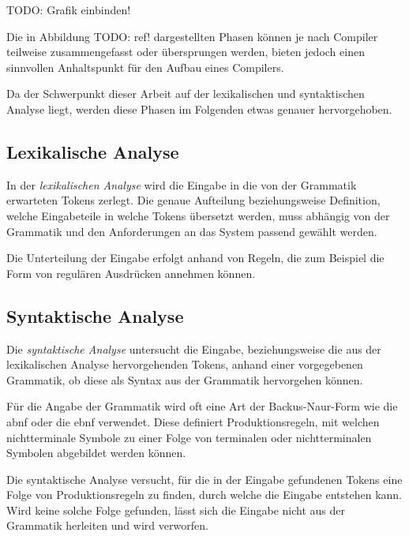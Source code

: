 \documentclass[oneside]{ausarbeitung}
\begin{document}
	TODO: Grafik einbinden!
	
	Die in Abbildung TODO: ref! dargestellten Phasen können je nach Compiler teilweise zusammengefasst oder übersprungen werden, bieten jedoch einen sinnvollen Anhaltspunkt für den Aufbau eines Compilers.
	
	Da der Schwerpunkt dieser Arbeit auf der lexikalischen und syntaktischen Analyse liegt, werden diese Phasen im Folgenden etwas genauer hervorgehoben.
	
	
	\subsection{Lexikalische Analyse}
	
	In der \textit{lexikalischen Analyse} wird die Eingabe in die von der Grammatik erwarteten Tokens zerlegt. Die genaue Aufteilung beziehungsweise Definition, welche Eingabeteile in welche Tokens übersetzt werden, muss abhängig von der Grammatik und den Anforderungen an das System passend gewählt werden.
	
	Die Unterteilung der Eingabe erfolgt anhand von Regeln, die zum Beispiel die Form von regulären Ausdrücken annehmen können. 

	 
	
	\subsection{Syntaktische Analyse}
	
	Die \textit{syntaktische Analyse} untersucht die Eingabe, beziehungsweise die aus der lexikalischen Analyse hervorgehenden Tokens, anhand einer vorgegebenen Grammatik, ob diese als Syntax aus der Grammatik hervorgehen können. 
	
	Für die Angabe der Grammatik wird oft eine Art der Backus-Naur-Form wie die \ac{abnf} oder die {ebnf} verwendet. Diese definiert Produktionsregeln, mit welchen nichtterminale Symbole zu einer Folge von terminalen oder nichtterminalen Symbolen abgebildet werden können. 
	
	Die syntaktische Analyse versucht, für die in der Eingabe gefundenen Tokens eine Folge von Produktionsregeln zu finden, durch welche die Eingabe entstehen kann. Wird keine solche Folge gefunden, lässt sich die Eingabe nicht aus der Grammatik herleiten und wird verworfen.
	
	
\end{document}
